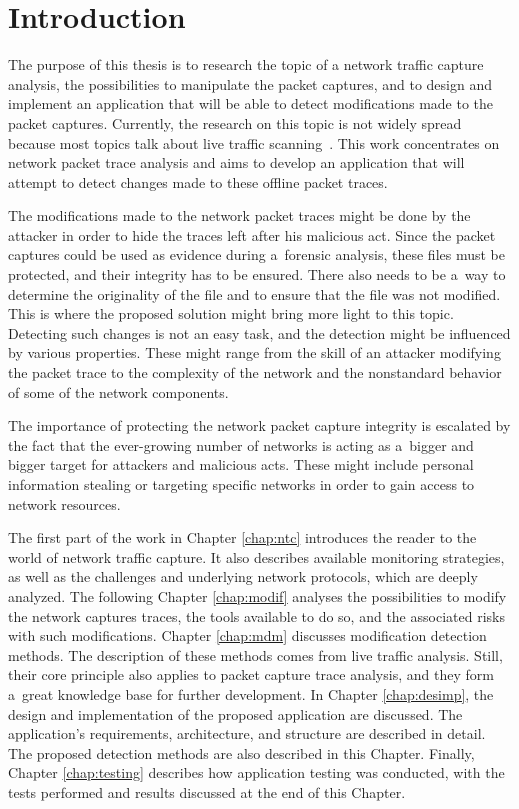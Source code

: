 \documentclass[
  printed,     %
  color,       %
  oneside,     %
  nosansbold,  %
  nocolorbold, %
  nolof,         %
  nolot,         %
]{fithesis4}
\begin{document}
\chapter{Introduction}

The purpose of this thesis is to research the topic of a network traffic capture analysis, the possibilities to manipulate the packet captures, and to design and implement an application that will be able to detect modifications made to the packet captures. Currently, the research on this topic is not widely spread because most topics talk about live traffic scanning~\cite{ABBASI202119}. This work concentrates on network packet trace analysis and aims to develop an application that will attempt to detect changes made to these offline packet traces.

The modifications made to the network packet traces might be done by the attacker in order to hide the traces left after his malicious act. Since the packet captures could be used as evidence during a~forensic analysis, these files must be protected, and their integrity has to be ensured. There also needs to be a~way to determine the originality of the file and to ensure that the file was not modified. This is where the proposed solution might bring more light to this topic. Detecting such changes is not an easy task, and the detection might be influenced by various properties. These might range from the skill of an attacker modifying the packet trace to the complexity of the network and the nonstandard behavior of some of the network components.

The importance of protecting the network packet capture integrity is escalated by the fact that the ever-growing number of networks is acting as a~bigger and bigger target for attackers and malicious acts. These might include personal information stealing or targeting specific networks in order to gain access to network resources.

The first part of the work in Chapter \ref{chap:ntc} introduces the reader to the world of network traffic capture. It also describes available monitoring strategies, as well as the challenges and underlying network protocols, which are deeply analyzed. The following Chapter \ref{chap:modif} analyses the possibilities to modify the network captures traces, the tools available to do so, and the associated risks with such modifications.
Chapter \ref{chap:mdm} discusses modification detection methods. The description of these methods comes from live traffic analysis. Still, their core principle also applies to packet capture trace analysis, and they form a~great knowledge base for further development. In Chapter \ref{chap:desimp}, the design and implementation of the proposed application are discussed. The application's requirements, architecture, and structure are described in detail. The proposed detection methods are also described in this Chapter. Finally, Chapter \ref{chap:testing} describes how application testing was conducted, with the tests performed and results discussed at the end of this Chapter.
\end{document}
